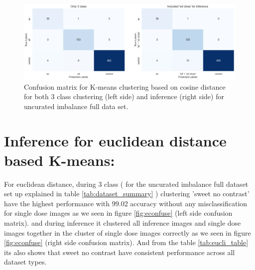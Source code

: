 \begin{table}[H]
    \centering
    \caption{Inference evaluation results on cosine distance based K-means}
    \label{tab:professional_table}
\end{table}

\begin{figure}[H]
    \centering
    \includegraphics[scale=0.37]{figures/cconfusion.png} 
    \caption{Confusion matrix for K-means clustering based on cosine distance for both 3 class clustering (left side) and inference (right side) for uncurated imbalance full data set. }
    \label{fig:cconfusion}
\end{figure}



\section{Inference for euclidean distance based K-means:}
For euclidean distance, during 3 class ( for the uncurated imbalance full dataset set up explained in table \ref{tab:dataset_summary} ) clustering 'sweet no contrast' have the highest performance with 99.02 accuracy without any misclassification for single dose images as we seen 
in figure \ref{fig:econfuse} (left side confusion matrix). and during inference  it clustered all inference images and single dose images together in the cluster of single dose images correctly as we seen in figure \ref{fig:econfuse} (right side confusion matrix). And from the table \ref{tab:eucli_table} its also shows that sweet no contrast have consistent performance across all dataset types.



